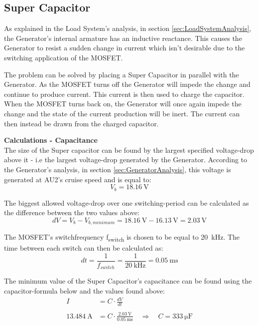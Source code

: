 \subsection{Super Capacitor}
As explained in the Load System's analysis, in section \vref{sec:LoadSystemAnalysis}, the Generator's internal armature has an inductive reactance. This causes the Generator to resist a sudden change in current which isn't desirable due to the switching application of the MOSFET.

The problem can be solved by placing a Super Capacitor in parallel with the Generator. As the MOSFET turns off the Generator will impede the change and continue to produce current. This current is then used to charge the capacitor. When the MOSFET turns back on, the Generator will once again impede the change and the state of the current production will be inert. The current can then instead be drawn from the charged capacitor.


\textbf{Calculations - Capacitance}\\
The size of the Super capacitor can be found by the largest specified voltage-drop above it - i.e the largest voltage-drop generated by the Generator. According to the Generator's analysis, in section \vref{sec:GeneratorAnalysis}, this voltage is generated at AU2's cruise speed and is equal to:
\begin{equation}
	V_b = \SI{18.16}{\volt}
\end{equation}
 
The biggest allowed voltage-drop over one switching-period can be calculated as the difference between the two values above:
\begin{equation}
	dV = V_b - V_{b,minimum} = \SI{18.16}{\volt} - \SI{16.13}{\volt} = \SI{2.03}{\volt}
\end{equation}
 
The MOSFET's switchfrequency f\textsubscript{switch} is chosen to be equal to \SI{20}{\kilo \hertz}. The time between each switch can then be calculated as:
\begin{equation}
	dt = \frac{1}{f_{switch}} = \frac{1}{\SI{20}{\kilo \hertz}} = \SI{0.05}{\milli \second}
\end{equation}

The minimum value of the Super Capacitor's capacitance can be found using the capacitor-formula below and the values found above:
\begin{equation}
	\begin{split}
		I &= C \cdot \frac{dV}{dt}\\
		\\
		\SI{13.484}{\ampere} &= C \cdot \frac{\SI{2.03}{\volt}}{\SI{0.05}{\milli \second}} \quad \Rightarrow \quad C = \SI{333}{\micro \farad}
	\end{split}
\end{equation}

